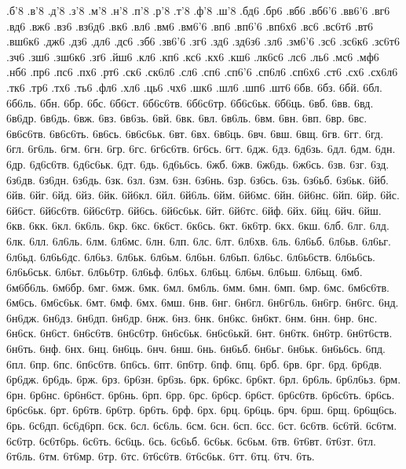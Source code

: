 {%
.б'8 .в'8 .д'8 .з'8 .м'8 .н'8 .п'8 .р'8
.т'8 .ф'8 .ш'8 .бд6 .бр6 .вб6 .вб6'6 .вв6'6
.вг6 .вд6 .вж6 .вз6 .вз6д6 .вк6 .вл6 .вм6
.вм6'6 .вп6 .вп6'6 .вп6х6 .вс6 .вс6т6 .вт6 .вш6к6
.дж6 .дз6 .дл6 .дс6 .зб6 .зв6'6 .зг6 .зд6
.зд6з6 .зл6 .зм6'6 .зс6 .зс6к6 .зс6т6 .зч6 .зш6
.зш6к6 .зґ6 .йш6 .кл6 .кп6 .кс6 .кх6 .кш6
.лк6с6 .лс6 .ль6 .мс6 .мф6 .нб6 .пр6 .пс6
.пх6 .рт6 .ск6 .ск6л6 .сл6 .сп6 .сп6'6 .сп6л6
.сп6х6 .ст6 .сх6 .сх6л6 .тк6 .тр6 .тх6 .ть6
.фл6 .хл6 .ць6 .чх6 .шк6 .шл6 .шп6 .шт6
6бв. 6бз. 6бй. 6бл. 6б6ль. 6бн. 6бр. 6бс.
6б6ст. 6б6с6тв. 6б6с6тр. 6б6с6ьк. 6б6ць. 6вб. 6вв. 6вд.
6в6др. 6в6дь. 6вж. 6вз. 6в6зь. 6вй. 6вк. 6вл.
6в6ль. 6вм. 6вн. 6вп. 6вр. 6вс. 6в6с6тв. 6в6с6ть.
6в6сь. 6в6с6ьк. 6вт. 6вх. 6в6ць. 6вч. 6вш. 6вщ.
6гв. 6гг. 6гд. 6гл. 6г6ль. 6гм. 6гн. 6гр.
6гс. 6г6с6тв. 6г6сь. 6гт. 6дж. 6дз. 6д6зь. 6дл.
6дм. 6дн. 6др. 6д6с6тв. 6д6с6ьк. 6дт. 6дь. 6д6ь6сь.
6жб. 6жв. 6ж6дь. 6ж6сь. 6зв. 6зг. 6зд. 6з6дв.
6з6дн. 6з6дь. 6зк. 6зл. 6зм. 6зн. 6з6нь. 6зр.
6з6сь. 6зь. 6з6ьб. 6з6ьк. 6йб. 6йв. 6йг. 6йд.
6йз. 6йк. 6й6кл. 6йл. 6й6ль. 6йм. 6й6мс. 6йн.
6й6нс. 6йп. 6йр. 6йс. 6й6ст. 6й6с6тв. 6й6с6тр. 6й6сь.
6й6с6ьк. 6йт. 6й6тс. 6йф. 6йх. 6йц. 6йч. 6йш.
6кв. 6кк. 6кл. 6к6ль. 6кр. 6кс. 6к6ст. 6к6сь.
6кт. 6к6тр. 6кх. 6кш. 6лб. 6лг. 6лд. 6лк.
6лл. 6л6ль. 6лм. 6л6мс. 6лн. 6лп. 6лс. 6лт.
6л6хв. 6ль. 6л6ьб. 6л6ьв. 6л6ьг. 6л6ьд. 6л6ь6дс. 6л6ьз.
6л6ьк. 6л6ьм. 6л6ьн. 6л6ьп. 6л6ьс. 6л6ь6ств. 6л6ь6сь. 6л6ь6ськ.
6л6ьт. 6л6ь6тр. 6л6ьф. 6л6ьх. 6л6ьц. 6л6ьч. 6л6ьш. 6л6ьщ.
6мб. 6м6б6ль. 6м6бр. 6мг. 6мж. 6мк. 6мл. 6м6ль.
6мм. 6мн. 6мп. 6мр. 6мс. 6м6с6тв. 6м6сь. 6м6с6ьк.
6мт. 6мф. 6мх. 6мш. 6нв. 6нг. 6н6гл. 6н6г6ль.
6н6гр. 6н6гс. 6нд. 6н6дж. 6н6дз. 6н6дп. 6н6др. 6нж.
6нз. 6нк. 6н6кс. 6н6кт. 6нм. 6нн. 6нр. 6нс.
6н6ск. 6н6ст. 6н6с6тв. 6н6с6тр. 6н6с6ьк. 6н6с6ькй. 6нт. 6н6тк.
6н6тр. 6н6т6ств. 6н6ть. 6нф. 6нх. 6нц. 6н6ць. 6нч.
6нш. 6нь. 6н6ьб. 6н6ьг. 6н6ьк. 6н6ь6сь. 6пд. 6пл.
6пр. 6пс. 6п6с6тв. 6п6сь. 6пт. 6п6тр. 6пф. 6пц.
6рб. 6рв. 6рг. 6рд. 6р6дв. 6р6дж. 6р6дь. 6рж.
6рз. 6р6зн. 6р6зь. 6рк. 6р6кс. 6р6кт. 6рл. 6р6ль.
6р6л6ьз. 6рм. 6рн. 6р6нс. 6р6н6ст. 6р6нь. 6рп. 6рр.
6рс. 6р6ср. 6р6ст. 6р6с6тв. 6р6с6ть. 6р6сь. 6р6с6ьк. 6рт.
6р6тв. 6р6тр. 6р6ть. 6рф. 6рх. 6рц. 6р6ць. 6рч.
6рш. 6рщ. 6р6щ6сь. 6рь. 6с6дп. 6с6д6рп. 6ск. 6сл.
6с6ль. 6см. 6сн. 6сп. 6сс. 6ст. 6с6тв. 6с6тй.
6с6тм. 6с6тр. 6с6т6рь. 6с6ть. 6с6ць. 6сь. 6с6ьб. 6с6ьк.
6с6ьм. 6тв. 6т6вт. 6т6зт. 6тл. 6т6ль. 6тм. 6т6мр.
6тр. 6тс. 6т6с6тв. 6т6с6ьк. 6тт. 6тц. 6тч. 6ть.
}
